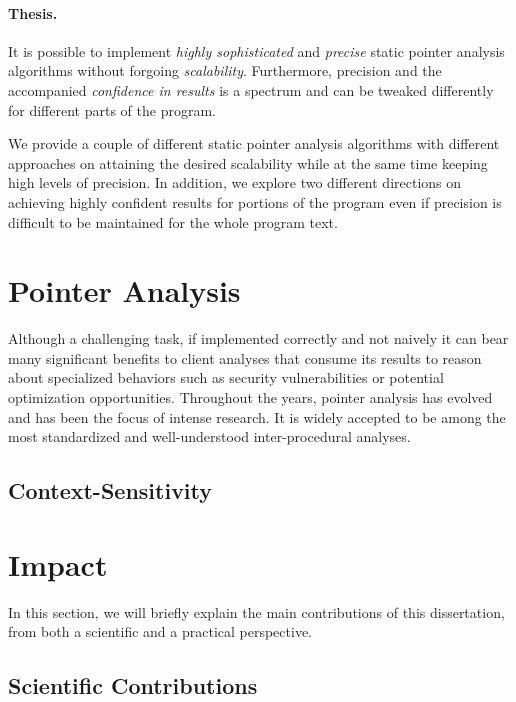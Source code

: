 \paragraph*{Thesis.}
\begin{displayquote}
It is possible to implement \emph{highly sophisticated} and \emph{precise} static pointer analysis algorithms without forgoing \emph{scalability}. Furthermore, precision and the accompanied \emph{confidence in results} is a spectrum and can be tweaked differently for different parts of the program.
\end{displayquote}

We provide a couple of different static pointer analysis algorithms with different approaches on attaining the desired scalability while at the same time keeping high levels of precision. In addition, we explore two different directions on achieving highly confident results for portions of the program even if precision is difficult to be maintained for the whole program text.

\section{Pointer Analysis}

Although a challenging task, if implemented correctly and not naively it can bear many significant benefits to client analyses that consume its results to reason about specialized behaviors such as security vulnerabilities or potential optimization opportunities. Throughout the years, pointer analysis has evolved and has been the focus of intense research. It is widely accepted to be among the most standardized and well-understood inter-procedural analyses.

\subsection{Context-Sensitivity}


\section{Impact}

In this section, we will briefly explain the main contributions of this dissertation, from both a scientific and a practical perspective.

\subsection{Scientific Contributions}


